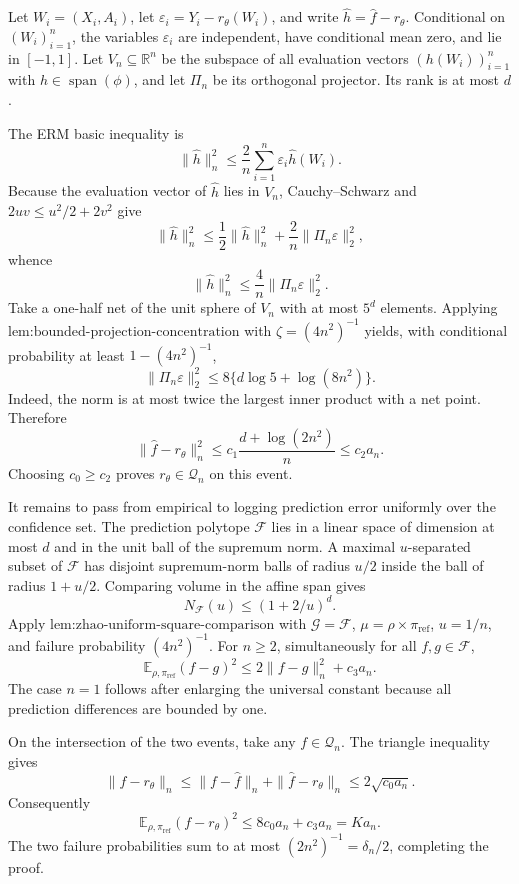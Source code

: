Let \(W_i=(X_i,A_i)\), let \(\varepsilon_i=Y_i-r_\theta(W_i)\), and write \(\widehat h=\widehat f-r_\theta\). Conditional on \((W_i)_{i=1}^n\), the variables \(\varepsilon_i\) are independent, have conditional mean zero, and lie in \([-1,1]\). Let \(V_n\subseteq\mathbb R^n\) be the subspace of all evaluation vectors \((h(W_i))_{i=1}^n\) with \(h\in\operatorname{span}(\phi)\), and let \(\Pi_n\) be its orthogonal projector. Its rank is at most \(d\).

The ERM basic inequality is
\[
\|\widehat h\|_n^2
\le\frac2n\sum_{i=1}^n\varepsilon_i\widehat h(W_i).
\]
Because the evaluation vector of \(\widehat h\) lies in \(V_n\), Cauchy--Schwarz and \(2uv\le u^2/2+2v^2\) give
\[
\|\widehat h\|_n^2
\le\frac12\|\widehat h\|_n^2+\frac2n\|\Pi_n\varepsilon\|_2^2,
\]
whence
\[
\|\widehat h\|_n^2\le\frac4n\|\Pi_n\varepsilon\|_2^2.
\]
Take a one-half net of the unit sphere of \(V_n\) with at most \(5^d\) elements. Applying \(\text{lem:bounded-projection-concentration}\) with \(\zeta=(4n^2)^{-1}\) yields, with conditional probability at least \(1-(4n^2)^{-1}\),
\[
\|\Pi_n\varepsilon\|_2^2
\le 8\{d\log5+\log(8n^2)\}.
\]
Indeed, the norm is at most twice the largest inner product with a net point. Therefore
\[
\|\widehat f-r_\theta\|_n^2
\le c_1\frac{d+\log(2n^2)}n
\le c_2a_n.
\]
Choosing \(c_0\ge c_2\) proves \(r_\theta\in\mathcal Q_n\) on this event.

It remains to pass from empirical to logging prediction error uniformly over the confidence set. The prediction polytope \(\mathcal F\) lies in a linear space of dimension at most \(d\) and in the unit ball of the supremum norm. A maximal \(u\)-separated subset of \(\mathcal F\) has disjoint supremum-norm balls of radius \(u/2\) inside the ball of radius \(1+u/2\). Comparing volume in the affine span gives
\[
N_{\mathcal F}(u)\le(1+2/u)^d.
\]
Apply \(\text{lem:zhao-uniform-square-comparison}\) with \(\mathcal G=\mathcal F\), \(\mu=\rho\times\pi_{\mathrm{ref}}\), \(u=1/n\), and failure probability \((4n^2)^{-1}\). For \(n\ge2\), simultaneously for all \(f,g\in\mathcal F\),
\[
\mathbb E_{\rho,\pi_{\mathrm{ref}}}(f-g)^2
\le2\|f-g\|_n^2+c_3a_n.
\]
The case \(n=1\) follows after enlarging the universal constant because all prediction differences are bounded by one.

On the intersection of the two events, take any \(f\in\mathcal Q_n\). The triangle inequality gives
\[
\|f-r_\theta\|_n
\le\|f-\widehat f\|_n+\|\widehat f-r_\theta\|_n
\le2\sqrt{c_0a_n}.
\]
Consequently
\[
\mathbb E_{\rho,\pi_{\mathrm{ref}}}(f-r_\theta)^2
\le8c_0a_n+c_3a_n=Ka_n.
\]
The two failure probabilities sum to at most \((2n^2)^{-1}=\delta_n/2\), completing the proof.